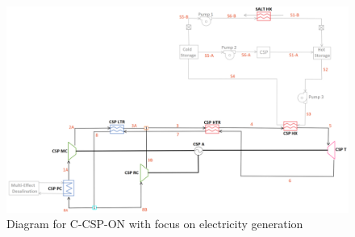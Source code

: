 \begin{figure}[H] 
    \widefigure
    \includegraphics[width=\linewidth]{Definitions/c-csp-on.pdf}
    \caption{Diagram for C-CSP-ON with focus on electricity generation\label{c-csp-on}}
\end{figure}
